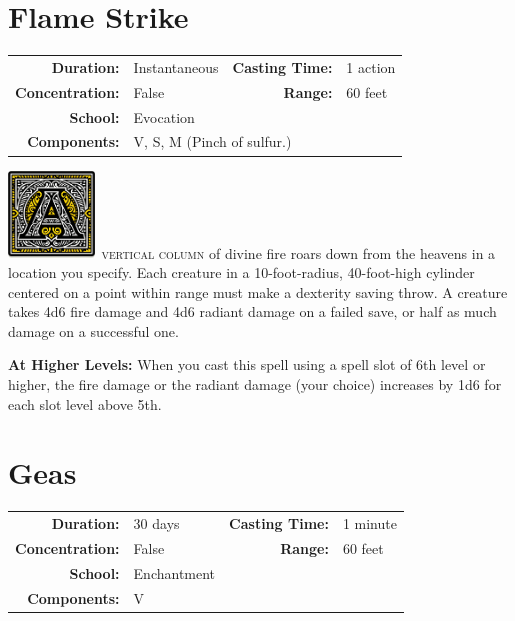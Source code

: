\documentclass[12pt,showtrims]{memoir}
\begin{document}
\section*{Flame Strike}

{
\small\centering\vspace{-6pt}
\begin{tabular}{rlrl}
\toprule

\textbf{Duration:} & Instantaneous &
\textbf{Casting Time:} & 1 action \\
\textbf{Concentration:} & False &
\textbf{Range:} & 60 feet \\
\textbf{School:} & Evocation \\
\textbf{Components:} & \multicolumn{3}{p{0.7\textwidth}}{V, S, M (Pinch of sulfur.)}\\

\bottomrule
\end{tabular}
}

\vspace{1\baselineskip}\noindent
\lettrine[lines=4]{\includegraphics[height=66pt]{initials/A.png}}{\ vertical column} of divine fire roars down from the heavens in a location you specify. Each creature in a 10-foot-radius, 40-foot-high cylinder centered on a point within range must make a dexterity saving throw. A creature takes 4d6 fire damage and 4d6 radiant damage on a failed save, or half as much damage on a successful one.

\vspace{8pt} \noindent\textbf{At Higher Levels:} When you cast this spell using a spell slot of 6th level or higher, the fire damage or the radiant damage (your choice) increases by 1d6 for each slot level above 5th.
\newpage
\section*{Geas}
{
\small\centering\vspace{-6pt}
\begin{tabular}{rlrl}
\toprule

\textbf{Duration:} & 30 days &
\textbf{Casting Time:} & 1 minute \\
\textbf{Concentration:} & False &
\textbf{Range:} & 60 feet \\
\textbf{School:} & Enchantment \\
\textbf{Components:} & \multicolumn{3}{p{0.7\textwidth}}{V}\\

\bottomrule
\end{tabular}
}
\end{document}
